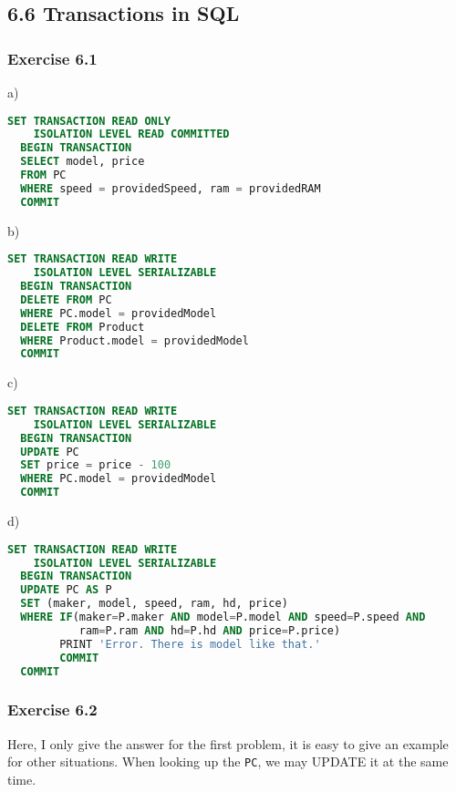 \documentclass[../../main.tex]{subfiles}
\begin{document}
\subsection{6.6 Transactions in SQL}

\subsubsection*{Exercise 6.1}

a)

\begin{lstlisting}[language=sql]
  SET TRANSACTION READ ONLY
    ISOLATION LEVEL READ COMMITTED
  BEGIN TRANSACTION
  SELECT model, price
  FROM PC
  WHERE speed = providedSpeed, ram = providedRAM
  COMMIT
\end{lstlisting}

b)

\begin{lstlisting}[language=sql]
  SET TRANSACTION READ WRITE
    ISOLATION LEVEL SERIALIZABLE
  BEGIN TRANSACTION
  DELETE FROM PC
  WHERE PC.model = providedModel
  DELETE FROM Product
  WHERE Product.model = providedModel
  COMMIT
\end{lstlisting}

c)

\begin{lstlisting}[language=sql]
  SET TRANSACTION READ WRITE
    ISOLATION LEVEL SERIALIZABLE
  BEGIN TRANSACTION
  UPDATE PC
  SET price = price - 100
  WHERE PC.model = providedModel
  COMMIT
\end{lstlisting}

d)

\begin{lstlisting}[language=sql]
  SET TRANSACTION READ WRITE
    ISOLATION LEVEL SERIALIZABLE
  BEGIN TRANSACTION
  UPDATE PC AS P
  SET (maker, model, speed, ram, hd, price)
  WHERE IF(maker=P.maker AND model=P.model AND speed=P.speed AND
           ram=P.ram AND hd=P.hd AND price=P.price)
        PRINT 'Error. There is model like that.'
        COMMIT
  COMMIT
\end{lstlisting}

\subsubsection*{Exercise 6.2}

Here, I only give the answer for the first problem, it is easy to give an example for
other situations. When looking up the \verb|PC|, we may UPDATE it at the same time.
\end{document}
